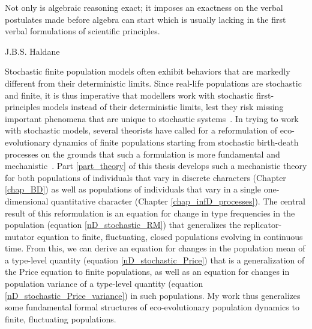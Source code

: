 \epigraph{\justifying Not only is algebraic reasoning exact; it imposes an exactness on the verbal postulates made before algebra can start which is usually lacking in the first verbal formulations of scientific principles.}{J.B.S. Haldane~\citep{haldane_defense_1964}}

Stochastic finite population models often exhibit behaviors that are markedly different from their deterministic limits. Since real-life populations are stochastic and finite, it is thus imperative that modellers work with stochastic first-principles models instead of their deterministic limits, lest they risk missing important phenomena that are unique to stochastic systems~\citep{black_stochastic_2012,schreiber_does_2022,hastings_transients_2004,shoemaker_integrating_2020}. In trying to work with stochastic models, several theorists have called for a reformulation of eco-evolutionary dynamics of finite populations starting from stochastic birth-death processes on the grounds that such a formulation is more fundamental and mechanistic~\citep{metcalf_why_2007,geritz_mathematical_2012,doebeli_towards_2017}. Part \ref{part_theory} of this thesis develops such a mechanistic theory for both populations of individuals that vary in discrete characters (Chapter \ref{chap_BD}) as well as populations of individuals that vary in a single one-dimensional quantitative character (Chapter \ref{chap_infD_processes}). The central result of this reformulation is an equation for change in type frequencies in the population (equation \eqref{nD_stochastic_RM}) that generalizes the replicator-mutator equation to finite, fluctuating, closed populations evolving in continuous time. From this, we can derive an equation for changes in the population mean of a type-level quantity (equation \eqref{nD_stochastic_Price}) that is a generalization of the Price equation to finite populations, as well as an equation for changes in population variance of a type-level quantity (equation \eqref{nD_stochastic_Price_variance}) in such populations. My work thus generalizes some fundamental formal structures of eco-evolutionary population dynamics to finite, fluctuating populations.

